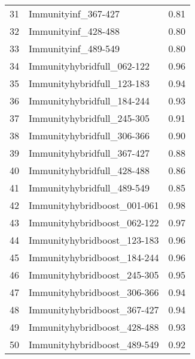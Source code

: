 \begin{table}[ht]
\begin{tabular}{rlr}
  31 & Immunityinf\_367-427 & 0.81 \\ 
  32 & Immunityinf\_428-488 & 0.80 \\ 
  33 & Immunityinf\_489-549 & 0.80 \\ 
  34 & Immunityhybridfull\_062-122 & 0.96 \\ 
  35 & Immunityhybridfull\_123-183 & 0.94 \\ 
  36 & Immunityhybridfull\_184-244 & 0.93 \\ 
  37 & Immunityhybridfull\_245-305 & 0.91 \\ 
  38 & Immunityhybridfull\_306-366 & 0.90 \\ 
  39 & Immunityhybridfull\_367-427 & 0.88 \\ 
  40 & Immunityhybridfull\_428-488 & 0.86 \\ 
  41 & Immunityhybridfull\_489-549 & 0.85 \\ 
  42 & Immunityhybridboost\_001-061 & 0.98 \\ 
  43 & Immunityhybridboost\_062-122 & 0.97 \\ 
  44 & Immunityhybridboost\_123-183 & 0.96 \\ 
  45 & Immunityhybridboost\_184-244 & 0.96 \\ 
  46 & Immunityhybridboost\_245-305 & 0.95 \\ 
  47 & Immunityhybridboost\_306-366 & 0.94 \\ 
  48 & Immunityhybridboost\_367-427 & 0.94 \\ 
  49 & Immunityhybridboost\_428-488 & 0.93 \\ 
  50 & Immunityhybridboost\_489-549 & 0.92 \\ 
   \hline
\end{tabular}
\end{table}
